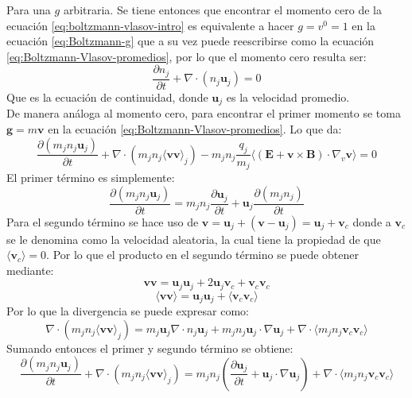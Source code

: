 \documentclass[../tesis_main_file.tex]{subfiles}
\begin{document}
Para una $g$ arbitraria. Se tiene entonces que encontrar el momento cero de la ecuación \ref{eq:boltzmann-vlasov-intro} es equivalente a hacer $g=v^0=1$ en la ecuación \ref{eq:Boltzmann-g} que a su vez puede reescribirse como la ecuación \ref{eq:Boltzmann-Vlasov-promedios}, por lo que el momento cero resulta ser:
\begin{equation}
\frac{\partial n_j}{\partial t}+\nabla \cdot (n_j \textbf{u}_j)=0
\end{equation}
Que es la ecuación de continuidad, donde $\textbf{u}_j$ es la velocidad promedio.\\
De manera análoga al momento cero, para encontrar el primer momento se toma $\textbf{g}=m\textbf{v}$ en la ecuación \ref{eq:Boltzmann-Vlasov-promedios}. Lo que da:
\begin{equation}
\frac{\partial (m_jn_j\textbf{u}_j)}{\partial t}+\nabla \cdot (m_jn_j\langle \textbf{v}\textbf{v} \rangle_j)-m_jn_j\frac{q_j}{m_j}\langle (\textbf{E}+\textbf{v}\times \textbf{B})\cdot \nabla_v\textbf{v}\rangle=0
\end{equation}
El primer término es simplemente:
\begin{equation}
\frac{\partial (m_jn_j\textbf{u}_j)}{\partial t}= m_jn_j\frac{\partial \textbf{u}_j}{\partial t}+ \textbf{u}_j\frac{\partial (m_jn_j)}{\partial t}
\end{equation}
Para el segundo término se hace uso de $\textbf{v}=\textbf{u}_j+(\textbf{v}-\textbf{u}_j)=\textbf{u}_j+\textbf{v}_c$ donde a $\textbf{v}_c$ se le denomina como la velocidad aleatoria, la cual tiene la propiedad de que $\langle \textbf{v}_c \rangle=0$.
Por lo que el producto en el segundo término se puede obtener mediante:
\begin{equation}
\textbf{v}\textbf{v}=\textbf{u}_j \textbf{u}_j + 2\textbf{u}_j \textbf{v}_c + \textbf{v}_c \textbf{v}_c
\end{equation}
\begin{equation}
\langle \textbf{v} \textbf{v} \rangle = \textbf{u}_j \textbf{u}_j +\langle \textbf{v}_c \textbf{v}_c \rangle
\end{equation}
Por lo que la divergencia se puede expresar como:
\begin{equation}
\nabla \cdot (m_jn_j\langle \textbf{v}\textbf{v} \rangle_j)=m_j \textbf{u}_j\nabla \cdot n_j \textbf{u}_j+m_jn_j\textbf{u}_j\cdot \nabla \textbf{u}_j+\nabla \cdot \langle m_jn_j \textbf{v}_c \textbf{v}_c \rangle
\end{equation}
Sumando entonces el primer y segundo término se obtiene:
\begin{equation}
\frac{\partial (m_jn_j\textbf{u}_j)}{\partial t}+\nabla \cdot (m_jn_j\langle \textbf{v}\textbf{v} \rangle_j)=m_jn_j \left( \frac{\partial \textbf{u}_j}{\partial t}+\textbf{u}_j\cdot \nabla \textbf{u}_j \right)+ \nabla \cdot \langle m_jn_j \textbf{v}_c \textbf{v}_c \rangle
\end{equation}
\end{document}
